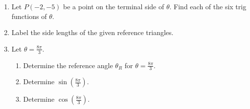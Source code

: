 



\begin{enumerate}
\item Let $P(-2,-5)$ be a point on the terminal side of $\theta$.
  Find each of the six trig functions of $\theta$.

\begin{enumerate}
\end{enumerate}

\vfill

\item Label the side lengths of the given reference triangles.
\begin{multicols}{2}
	 \quad \quad \quad \quad \quad \quad 
	\columnbreak

\end{multicols}
\clearpage


\item  Let $\displaystyle \theta=\frac{8\pi}{3}$.
\begin{enumerate}
\item Determine the reference angle $\theta_R$ for $\displaystyle \theta=\frac{8\pi}{3}$.\vfill
\item Determine $\sin\left(\frac{8\pi}{3}\right)$.\vfill
\item Determine $\cos\left(\frac{8\pi}{3}\right)$.\vfill
\end{enumerate}





\end{enumerate}



